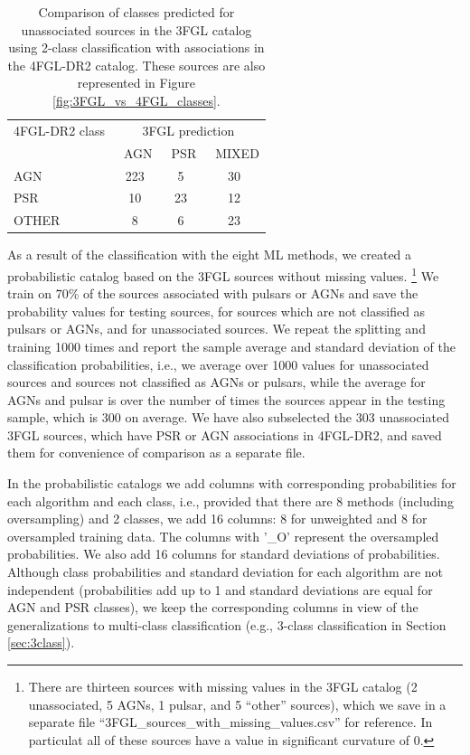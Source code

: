 \begin{table}[!h]
 \renewcommand{\tabcolsep}{0.3mm}
\renewcommand{\arraystretch}{1.5}

    \begin{tabular}{l c c c}
    \hline
    \hline
    4FGL-DR2 class & \multicolumn{3}{c}{3FGL prediction} \\
      &\ AGN &\ PSR &\ MIXED \\
    \hline
    AGN & 223 & 5 &  30 \\ %
    PSR & 10 & 23 &  12  \\ %
    OTHER & 8 & 6 & 23  \\ %
    \hline
    \end{tabular}%
    \vspace{0.2cm}
    \caption{Comparison of classes predicted for unassociated sources in the 3FGL catalog using 2-class classification
    with associations in the 4FGL-DR2 catalog. 
    These sources are also represented in Figure \ref{fig:3FGL_vs_4FGL_classes}.}
    \label{tab:3FGL_vs_4FGL_2class}
\end{table}


As a result of the classification with the eight ML methods,
we created a probabilistic catalog based on the 3FGL sources without missing values.%
\footnote{There are thirteen sources with missing values in the 3FGL catalog (2 unassociated, 5 AGNs, 1 pulsar, and 5 ``other'' sources), 
which we save in a separate file ``3FGL\_sources\_with\_missing\_values.csv'' for reference. In particulat all of these sources have a value in significant curvature of 0.
}
We train on 70\% of the sources associated with pulsars or AGNs and save the probability values for testing sources, for sources which are not classified as pulsars or AGNs, and for unassociated sources.
We repeat the splitting and training 1000 times and report the sample average and standard deviation of the classification probabilities,
i.e., we average over 1000 values for unassociated sources and sources not classified as AGNs or pulsars, 
while the average for AGNs and pulsar is over the number of times the sources appear in the testing sample, which is 300 on average.
We have also subselected the 303 unassociated 3FGL sources, which have PSR or AGN associations in 4FGL-DR2,
and saved them for convenience of comparison as a separate file.

In the probabilistic catalogs we add columns with corresponding probabilities for each algorithm and each class,
i.e., provided that there are 8 methods (including oversampling) and 2 classes, we add 16 columns: 8 for unweighted and 8 for oversampled training data. The columns with '\_O' represent the oversampled probabilities. We also add 16 columns for standard deviations of probabilities. Although class probabilities and standard deviation for each algorithm are not independent (probabilities add up to 1 and standard deviations are equal for AGN and PSR classes), we keep the corresponding columns in view of the generalizations to multi-class classification (e.g., 3-class classification in Section \ref{sec:3class}).

